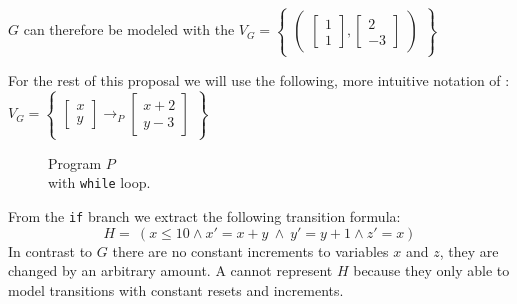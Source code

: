 $G$ can therefore be modeled with the \qvasr  
$V_G = 
\begin{Bmatrix}
	\begin{pmatrix}
		\begin{bmatrix}
			 1 \\
			 1
		\end{bmatrix},
		\begin{bmatrix}
			2 \\
			-3
		\end{bmatrix}
	\end{pmatrix}
\end{Bmatrix}
$ \par \vspace{2pt}
For the rest of this proposal we will use the following, more intuitive notation of \qvasr:
$V_G = 
\begin{Bmatrix}
	\begin{bmatrix}
		x \\
		y
	\end{bmatrix} \rightarrow_P
	\begin{bmatrix}
		x + 2 \\
		y - 3
	\end{bmatrix}
\end{Bmatrix}
$ \par
\begin{minipage}[t]{0.3\textwidth} \centering
	\begin{figure}[H]
		
		\caption{Program $P$ \\ with \texttt{while} loop.}
		\label{code}
	\end{figure}
\end{minipage}

\vspace*{1cm}
From the \texttt{if} branch we extract the following transition formula:
\begin{equation*}
	H= \ (x \leq 10 \land x' = x + y\ \land\ y' = y + 1 \land z' = x)
\end{equation*} In contrast to $G$ there are no constant increments to variables $x$ and $z$, they are changed by an arbitrary amount. A \qvasr cannot represent $H$ because they only able to model transitions with constant resets and increments. 

\newcommand{\s}{\ensuremath{\begin{bmatrix} s_1 \\ s_2 \\ s_3 \end{bmatrix}}}
\newcommand{\p}{\ensuremath{\begin{bmatrix} x' \\ y' \\ z' \end{bmatrix}}}
\newcommand{\up}{\ensuremath{\begin{bmatrix} x \\ y \\ z \end{bmatrix}}}

